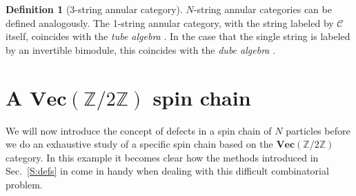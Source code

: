 \documentclass[aps,prb,twocolumn,superscriptaddress,noshowkeys]{revtex4-2}  %
\renewcommand{\Vec}{\textbf{Vec}}
\newcommand{\Z}{\mathbb{Z}}
\theoremstyle{plain}%
\theoremstyle{definition}
\newtheorem{definition}{Definition}[section]
\theoremstyle{remark}
\begin{document}
\begin{definition}[3-string annular category]
	$N$-string annular categories can be defined analogously. The 1-string annular category, with the string labeled by $\mathcal{C}$ itself, coincides with the \emph{tube algebra} \cite{ocneanu}. In the case that the single string is labeled by an invertible bimodule, this coincides with the \emph{dube algebra} \cite{WBV17}. 
\end{definition}

\section{A $\Vec(\Z/2\Z)$ spin chain}

\label{Ising}
We will now introduce the concept of defects in a spin chain of $N$ particles before we do an exhaustive study of a specific spin chain based on the $\Vec(\Z/2\Z)$ category. In this example it becomes clear how the methods introduced in Sec.~\ref{S:defs} in come in handy when dealing with this difficult combinatorial problem. 
\end{document}

